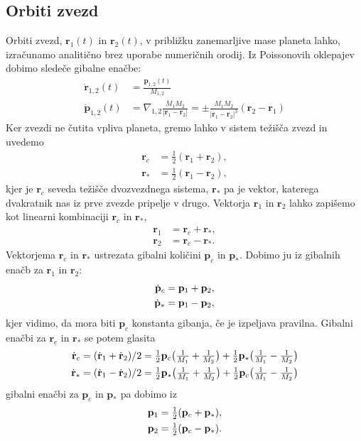 \documentclass[12pt, a4paper]{article}
\renewcommand{\r}{
    \ensuremath{\mathbf{r}}
}
\newcommand{\p}{
    \ensuremath{\mathbf{p}}
}
\newcommand{\sfrac}[2]{
    \ensuremath{\textstyle{\frac{#1}{#2}}}
}
\begin{document}
\subsection{Orbiti zvezd}
Orbiti zvezd, $\r_1(t)$ in $\r_2(t)$, v pribli\v zku zanemarljive mase planeta lahko, izra\v cunamo analiti\v cno brez
uporabe numeri\v cnih orodij. Iz Poissonovih oklepajev dobimo slede\v ce gibalne ena\v cbe:
\begin{align}
    \dot{\r}_{1,2}(t) &= \frac{\p_{1,2}(t)}{M_{1,2}} \\
    \dot{\p}_{1,2}(t) &= \nabla_{1,2} \frac{M_1 M_2}{|\r_1 - \r_2|} = \pm \frac{M_1 M_2}{|\r_1 - \r_2|^3}(\r_2 - \r_1)
    \label{predgibalni}
\end{align}
Ker zvezdi ne \v cutita vpliva planeta, gremo lahko v sistem te\v zi\v s\v ca zvezd in uvedemo
\begin{align*}
    \r_c &= \sfrac{1}{2}(\r_1 + \r_2), \\
    \r_* &= \sfrac{1}{2}(\r_1 - \r_2),
\end{align*}
kjer je $\r_c$ seveda te\v zi\v s\v ce dvozvezdnega sistema, $\r_*$ pa je vektor, katerega dvakratnik nas iz prve
zvezde pripelje v drugo. Vektorja $\r_1$ in $\r_2$ lahko zapi\v semo kot linearni kombinaciji $\r_c$ in $\r_*$,
\begin{align*}
    \r_1 &= \r_c + \r_*, \\
    \r_2 &= \r_c - \r_*.
\end{align*}
Vektorjema $\r_c$ in $\r_*$ ustrezata gibalni koli\v cini $\p_c$ in $\p_*$. Dobimo ju iz gibalnih ena\v cb za $\r_1$
in $\r_2$:
\begin{align}
    \dot{\p}_c &= \p_1 + \p_2, \notag \\
    \dot{\p}_* &= \p_1 - \p_2,
\end{align}
kjer vidimo, da mora biti $\p_c$ konstanta gibanja, \v ce je izpeljava pravilna. Gibalni ena\v cbi za $\r_c$ in $\r_*$ se
potem glasita
\begin{align}
    \dot{\r}_c &= (\dot{\r}_1 + \dot{\r}_2)/2 = \sfrac{1}{2}\p_c\big(\sfrac{1}{M_1} + \sfrac{1}{M_2}\big) +
        \sfrac{1}{2}\p_*\big(\sfrac{1}{M_1} - \sfrac{1}{M_2}\big) \notag \\
    \dot{\r}_* &= (\dot{\r}_1 - \dot{\r}_2)/2 = \sfrac{1}{2}\p_*\big(\sfrac{1}{M_1} + \sfrac{1}{M_2}\big) +
        \sfrac{1}{2}\p_c\big(\sfrac{1}{M_1} - \sfrac{1}{M_2}\big) \notag \\
\end{align}
gibalni ena\v cbi za $\p_c$ in $\p_*$ pa dobimo iz
\begin{align}
    \p_1 &= \sfrac{1}{2}(\p_c + \p_*), \notag \\
    \p_2 &= \sfrac{1}{2}(\p_c - \p_*).
\end{align}
\end{document}
